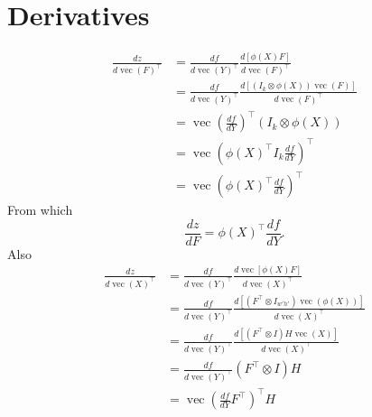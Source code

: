 \documentclass[12pt]{article}
\newcommand{\vv}{\operatorname{vec}}
\begin{document}
\section{Derivatives}
\begin{align*}
\frac{d z}{d \vv(F)^\top}
&=
\frac{d f}{d \vv(Y)^\top}
\frac{d [\phi(X) F]}{d\vv(F)^\top}
\\
&=
\frac{d f}{d \vv(Y)^\top}
\frac{d [\left(
I_k \otimes \phi(X)
\right)
\vv(F)]
}{d\vv(F)^\top}
\\
&=
\vv\left(\frac{d f}{d Y} \right)^\top
\left(
I_k \otimes \phi(X)
\right)
\\
&=
\vv\left(
\phi(X)^\top I_k \frac{d f}{d Y} 
\right)^\top
\\
&=
\vv\left(
\phi(X)^\top
\frac{d f}{d Y} 
\right)^\top
\end{align*}
From which
\[
\frac{dz}{dF}
=
\phi(X)^\top\frac{d f}{d Y}.
\]
Also
\begin{align*}
\frac{d z}{d \vv(X)^\top}
&=
\frac{d f}{d \vv(Y)^\top}
\frac{d \vv [\phi(X) F]}{d\vv(X)^\top}
\\
&=
\frac{d f}{d \vv(Y)^\top}
\frac{d [(F^\top \otimes I_{w'h'})\vv(\phi(X))]}{d\vv(X)^\top}
\\
&=
\frac{d f}{d \vv(Y)^\top}
\frac{d [(F^\top \otimes I)H \vv(X)]}{d\vv(X)^\top}
\\
&=
\frac{d f}{d \vv(Y)^\top} (F^\top\otimes I)H
\\
&=
\vv\left(
\frac{d f}{d Y}F^\top
\right)^\top H
\end{align*}
\end{document}
